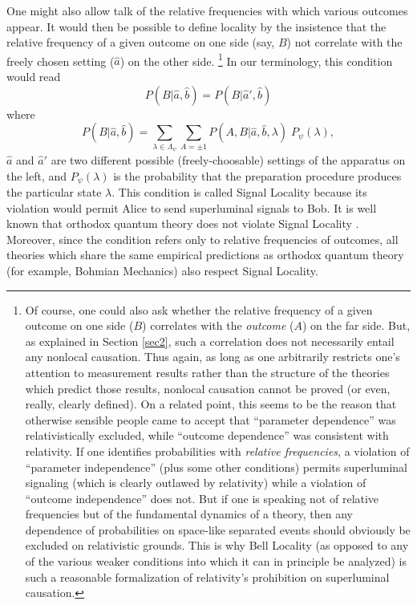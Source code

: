 \documentclass[aps,prc,onecolumn,12pt,nofootinbib]{revtex4-2}
\begin{document}
One might also allow talk of the relative frequencies with which
various outcomes appear.  It would then be possible to define
locality by the insistence that the
relative frequency of a given outcome on one side (say, $B$)
not correlate with the freely chosen setting ($\hat{a}$) on the other side.%
\footnote{Of course, one could also ask whether the relative frequency
of a given outcome on one side ($B$) correlates with the
\emph{outcome} ($A$) on the far side.  But, as explained in Section
\ref{sec2}, such a correlation does not necessarily entail any
nonlocal causation.  Thus again, as long as one arbitrarily restricts
one's attention to measurement results rather than the structure of
the theories which predict those results, nonlocal causation cannot
be proved (or even, really, clearly defined).  On a related point,
this seems to be the reason that otherwise sensible people came to
accept that ``parameter dependence'' was relativistically excluded,
while ``outcome dependence'' was consistent with relativity.  If one
identifies probabilities with \emph{relative frequencies}, a violation
of ``parameter independence'' (plus some other conditions)
permits superluminal signaling (which
is clearly outlawed by relativity) while a violation of ``outcome
independence'' does not.  But if one is speaking not of relative
frequencies but of the fundamental dynamics of a theory, then any
dependence of probabilities on space-like separated events should
obviously be excluded on relativistic grounds.  This is why Bell
Locality (as opposed to any of the various weaker conditions into
which it can in principle be analyzed) is such a reasonable
formalization of relativity's prohibition on superluminal causation.}
In our terminology, this condition would read
\begin{equation}
P(B|\hat{a},\hat{b}) = P(B|\hat{a}',\hat{b})
\end{equation}
where
\begin{equation}
P(B|\hat{a},\hat{b}) = \sum_{\lambda \in \Lambda_\psi }
\sum_{A = \pm 1} P(A,B|\hat{a},\hat{b},\lambda) \; P_\psi(\lambda),
\end{equation}
$\hat{a}$ and $\hat{a}'$ are two different possible
(freely-choosable) settings of the apparatus on the left,
and $P_\psi(\lambda)$
is the probability that the preparation procedure produces the
particular state $\lambda$.
This condition is called Signal Locality because its
violation would permit Alice to send superluminal signals to Bob.
It is well known that orthodox quantum theory does not violate Signal
Locality \cite{ballentinejarrett}.
Moreover, since the condition refers only to relative
frequencies of outcomes, all theories which share the same empirical
predictions as orthodox quantum theory (for example, Bohmian
Mechanics) also respect Signal Locality.
\end{document}

